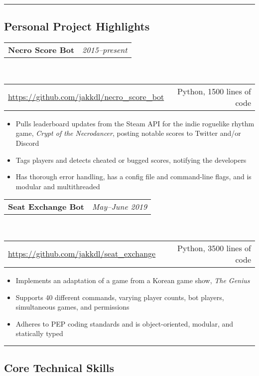 \documentclass[10pt,letterpaper]{article}
\makeatletter
\newcommand{\headerrow}[2]
{\begin{tabular*}{\linewidth}{l@{\extracolsep{\fill}}r}
    #1 &
    #2 \\
\end{tabular*}}
\makeatother
\begin{document}
\hrule
\vspace{-0.4em}
\subsection*{Personal Project Highlights}


\headerrow
    {\textbf{Necro Score Bot}}
    {\emph{2015--present}}
\\
\headerrow
    {\url{https://github.com/jakkdl/necro\_score\_bot}}
    {Python, 1500 lines of code}
\begin{itemize}[noitemsep, topsep=1pt]
    \item Pulls leaderboard updates from the Steam API for the indie roguelike
        rhythm game, \emph{Crypt of the Necrodancer}, posting notable scores
        to Twitter and/or Discord
    \item Tags players and detects cheated or bugged scores, notifying the
        developers
    \item Has thorough error handling, has a config file and command-line
        flags, and is modular and multithreaded
\end{itemize}

\vspace{0.5em}
\headerrow
    {\textbf{Seat Exchange Bot}}
    {\emph{May--June 2019}}
\\
\headerrow
    {\url{https://github.com/jakkdl/seat\_exchange}}
    {Python, 3500 lines of code}
\begin{itemize}[noitemsep, topsep=1pt]
    \item Implements an adaptation of a game from a Korean game show, \emph{The
        Genius}
    \item Supports 40 different commands, varying player counts,
        bot players, simultaneous games, and permissions
    \item Adheres to PEP coding standards and is object-oriented, modular,
        and statically typed
\end{itemize}



\vspace{1em}
\hrule
\vspace{-0.4em}
\subsection*{Core Technical Skills}
\end{document}
